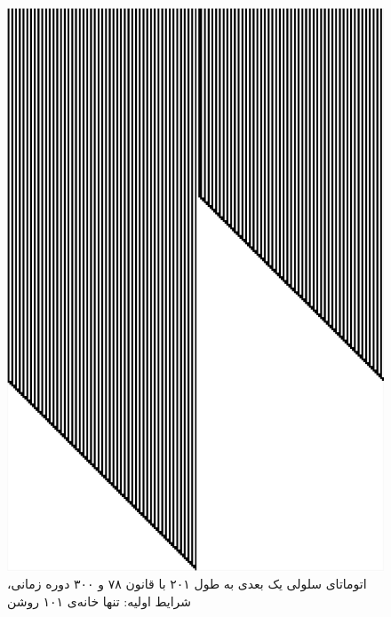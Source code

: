 \documentclass[11pt, a4paper]{article}
\begin{document}
\begin{figure}[!tbp]
\begin{minipage}[b]{0.3\textwidth}
    \includegraphics[width=\textwidth]{q3-78}
    \caption{اتوماتای سلولی یک بعدی به طول ۲۰۱ با قانون ۷۸ و ۳۰۰ دوره زمانی، شرایط اولیه: تنها خانه‌ی ۱۰۱ روشن}
    \label{fig:q3-78}
  \end{minipage}
  \hfill
	\begin{minipage}[b]{0.3\textwidth}

\end{minipage}
\end{figure}
\end{document}
